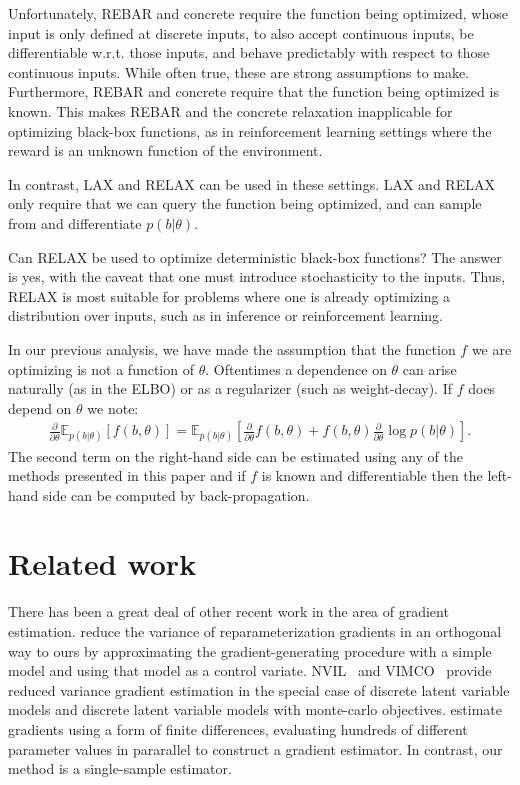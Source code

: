 \documentclass{article}
\newcommand{\E}{\mathbb{E}}
\newcommand{\PT}{\frac{\partial}{\partial \theta}}
\newcommand{\LAX}{{\textnormal{LAX}}}
\newcommand{\RELAX}{{\textnormal{RELAX}}}
\begin{document}
Unfortunately, REBAR and concrete require the function being optimized, whose input is only defined at discrete inputs, to also accept continuous inputs, be differentiable w.r.t. those inputs, and behave predictably with respect to those continuous inputs.
While often true, these are strong assumptions to make.
Furthermore, REBAR and concrete require that the function being optimized is known. 
This makes REBAR and the concrete relaxation inapplicable for optimizing black-box functions, as in reinforcement learning settings where the reward is an unknown function of the environment.

In contrast, \LAX{} and \RELAX{} can be used in these settings.
\LAX{} and \RELAX{} only require that we can query the function being optimized, and can sample from and differentiate $p(b|\theta)$.

Can \RELAX{} be used to optimize deterministic black-box functions?
The answer is yes, with the caveat that one must introduce stochasticity to the inputs.
Thus, \RELAX{} is most suitable for problems where one is already optimizing a distribution over inputs, such as in inference or reinforcement learning.

In our previous analysis, we have made the assumption that the function $f$ we are optimizing is not a function of $\theta$. Oftentimes a dependence on $\theta$ can arise naturally (as in the ELBO) or as a regularizer (such as weight-decay). If $f$ does depend on $\theta$ we note:
\begin{align}
\PT \E_{p(b|\theta)}[f(b, \theta)] = \E_{p(b|\theta)}\left[\PT f(b, \theta) + f(b, \theta)\PT \log p(b|\theta) \right].\nonumber
\end{align}
The second term on the right-hand side can be estimated using any of the methods presented in this paper and if $f$ is known and differentiable then the left-hand side can be computed by back-propagation.


\section{Related work}
There has been a great deal of other recent work in the area of gradient estimation.
\citet{miller2017reducing} reduce the variance of reparameterization gradients in an orthogonal way to ours by approximating the gradient-generating procedure with a simple model and using that model as a control variate.
NVIL~\citep{mnih2014neural} and VIMCO~\citep{mnih2016variational} provide reduced variance gradient estimation in the special case of discrete latent variable models and discrete latent variable models with monte-carlo objectives.
\citet{salimans2017evolution} estimate gradients using a form of finite differences, evaluating hundreds of different parameter values in pararallel to construct a gradient estimator.
In contrast, our method is a single-sample estimator.
\end{document}
